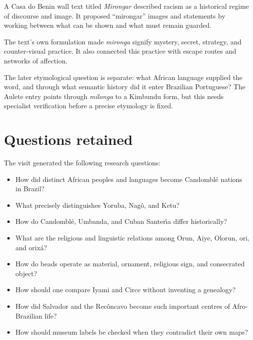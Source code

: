 A Casa do Benin wall text titled
\emph{Mirongar} described racism as a
historical regime of discourse and image.
It proposed ``mirongar'' images and
statements by working between what can be
shown and what must remain guarded.

The text's own formulation made
\emph{mironga} signify mystery, secret,
strategy, and counter-visual practice.  It
also connected this practice with escape
routes and networks of affection.

The later etymological question is separate:
what African language supplied the word,
and through what semantic history did it
enter Brazilian Portuguese?  The Aulete
entry points through \emph{milonga} to a
Kimbundu form, but this needs specialist
verification before a precise etymology is
fixed.

\section{Questions retained}

The visit generated the following research
questions:

\begin{itemize}
\item How did distinct African peoples and
languages become Candombl\'e nations in
Brazil?
\item What precisely distinguishes Yoruba,
Nag\^o, and Ketu?
\item How do Candombl\'e, Umbanda, and Cuban
Santer\'\i a differ historically?
\item What are the religious and linguistic
relations among Orun, Aiye, Olorun, ori,
and orix\'a?
\item How do beads operate as material,
ornament, religious sign, and consecrated
object?
\item How should one compare Iyami and
Circe without inventing a genealogy?
\item How did Salvador and the Rec\^oncavo
become such important centres of
Afro-Brazilian life?
\item How should museum labels be checked
when they contradict their own maps?
\end{itemize}





